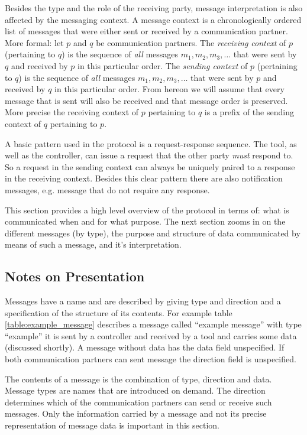 \documentclass{article}
\begin{document}
  Besides the type and the role of the receiving party, message interpretation
  is also affected by the messaging context. A message context is a chronologically
  ordered list of messages that were either sent or received by a communication
  partner.  More formal: let $p$ and $q$ be communication partners. The
  \textit{receiving context} of $p$ (pertaining to $q$) is the sequence of
  \emph{all} messages $m_{1}, m_{2}, m_{3}, \ldots$ that were sent by $q$ and
  received by $p$ in this particular order.  The \textit{sending context} of
  $p$ (pertaining to $q$) is the sequence of \emph{all} messages $m_{1}, m_{2},
  m_{3}, \ldots$ that were sent by $p$ and received by $q$ in this particular
  order. From hereon we will assume that every message that is sent will also
  be received and that message order is preserved. More precise the receiving
  context of $p$ pertaining to $q$ is a prefix of the sending context of $q$
  pertaining to $p$.

  A basic pattern used in the protocol is a request-response sequence. The
  tool, as well as the controller, can issue a request that the other party
  \emph{must} respond to. So a request in the sending context can always be
  uniquely paired to a response in the receiving context. Besides this clear
  pattern there are also notification messages, e.g. message that do not
  require any response.

  This section provides a high level overview of the protocol in terms of: what
  is communicated when and for what purpose. The next section zooms in on the
  different messages (by type), the purpose and structure of data communicated
  by means of such a message, and it's interpretation.

  \subsection{Notes on Presentation}

   Messages have a name and are described by giving type and direction and a
   specification of the structure of its contents. For example table
   \ref{table:example_message} describes a message called ``example message''
   with type ``example'' it is sent by a controller and received by a tool and
   carries some data (discussed shortly). A message without data has the data
   field unspecified. If both communication partners can sent message the
   direction field is unspecified.
   
   The contents of a message is the combination of type, direction and data.
   Message types are names that are introduced on demand. The direction
   determines which of the communication partners can send or receive such
   messages. Only the information carried by a message and not its precise
   representation of message data is important in this section.
   
\end{document}
